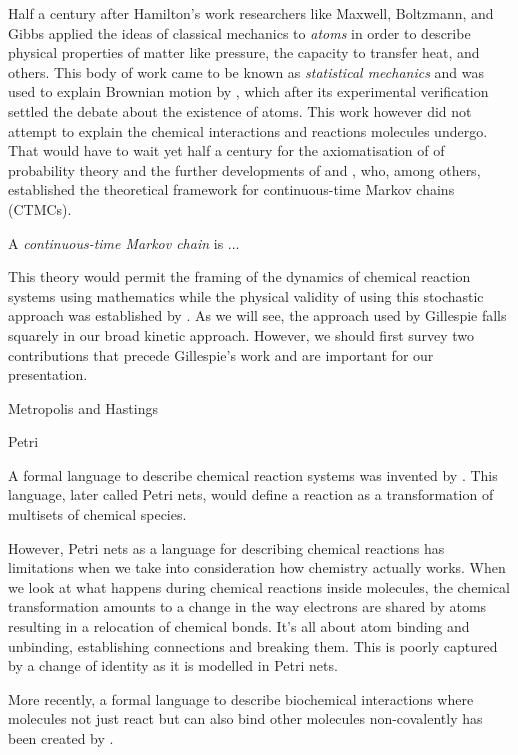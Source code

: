 Half a century after Hamilton's work
researchers like Maxwell, Boltzmann, and Gibbs %
applied the ideas of classical mechanics to \emph{atoms}
in order to describe physical properties of matter like pressure,
the capacity to transfer heat, and others.
This body of work came to be known as \emph{statistical mechanics}
and was used to explain Brownian motion by \citet{einstein-brownian},
which after its experimental verification \citep{perrin}
settled the debate about the existence of atoms.
This work however did not attempt to explain
the chemical interactions and reactions molecules undergo.
That would have to wait yet half a century
for the axiomatisation of \citet{kolmogorov} of probability theory
and the further developments of \citet{feller} and \citet{doob},
who, among others, established the theoretical framework
for continuous-time Markov chains (CTMCs).

\begin{definition}[CTMC]%
  A \emph{continuous-time Markov chain} is ...
\end{definition}

This theory would permit the framing of the dynamics of
chemical reaction systems using mathematics
while the physical validity of using this stochastic approach
was established by \citet{gillespie76}.
As we will see, the approach used by Gillespie falls squarely
in our broad kinetic approach.
However, we should first survey two contributions
that precede Gillespie's work and are important
for our presentation.

Metropolis and Hastings

Petri

A formal language to describe chemical reaction systems
was invented by \citet{petri}.
This language, later called Petri nets,
would define a reaction as a transformation of
multisets of chemical species.

However, Petri nets as a language for describing chemical reactions
has limitations when we take into consideration
how chemistry actually works.
When we look at what happens during chemical reactions
inside molecules, the chemical transformation amounts to
a change in the way electrons are shared by atoms
resulting in a relocation of chemical bonds.
It's all about atom binding and unbinding,
establishing connections and breaking them.
This is poorly captured by a change  of identity
as it is modelled in Petri nets.

More recently,
a formal language to describe biochemical interactions
where molecules not just react but can also bind other molecules
non-covalently has been created by \citet{danoslaneve2002a}.


















